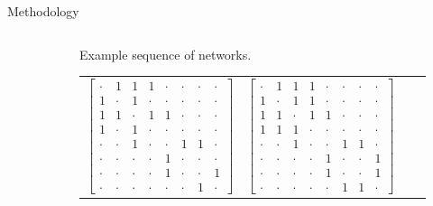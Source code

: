 \documentclass[12pt]{amsart}
\begin{document}
\begin{section}{Methodology}
\begin{figure}
\begin{subfigure}[c]{1\textwidth}
\begin{tabular}{llll}
                \end{tabular}
                \caption{Example sequence of networks.}
                \label{method nets}
                
            \end{subfigure}

            \begin{subfigure}[c]{1\textwidth}
                \begin{tabular}{llll}
                    $\begin{bmatrix}
                        \cdot & 1 & 1 & 1 & \cdot & \cdot & \cdot & \cdot\\
                        1 & \cdot & 1 & \cdot & \cdot & \cdot & \cdot & \cdot\\
                        1 & 1 & \cdot & 1 & 1 & \cdot & \cdot & \cdot\\
                        1 & \cdot & 1 & \cdot & \cdot & \cdot & \cdot & \cdot\\
                        \cdot & \cdot & 1 & \cdot & \cdot & 1 & 1 & \cdot\\
                        \cdot & \cdot & \cdot & \cdot & 1 & \cdot & \cdot & \cdot\\
                        \cdot & \cdot & \cdot & \cdot & 1 & \cdot & \cdot & 1\\
                        \cdot & \cdot & \cdot & \cdot & \cdot & \cdot & 1 & \cdot
                    \end{bmatrix}$
                    &
                    $\begin{bmatrix}
                        \cdot & 1 & 1 & 1 & \cdot & \cdot & \cdot & \cdot\\
                        1 & \cdot & 1 & 1 & \cdot & \cdot & \cdot & \cdot\\
                        1 & 1 & \cdot & 1 & 1 & \cdot & \cdot & \cdot\\
                        1 & 1 & 1 & \cdot & \cdot & \cdot & \cdot & \cdot\\
                        \cdot & \cdot & 1 & \cdot & \cdot & 1 & 1 & \cdot\\
                        \cdot & \cdot & \cdot & \cdot & 1 & \cdot & \cdot & 1\\
                        \cdot & \cdot & \cdot & \cdot & 1 & \cdot & \cdot & 1\\
                        \cdot & \cdot & \cdot & \cdot & \cdot & 1 & 1 & \cdot
                    \end{bmatrix}$

\end{tabular}
\end{subfigure}
\end{figure}
\end{section}
\end{document}
